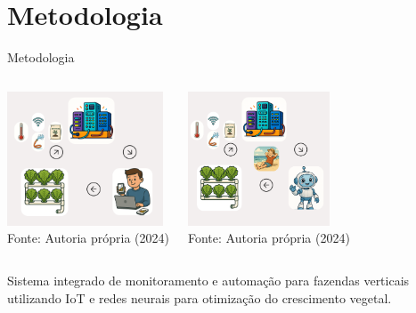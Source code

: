 \documentclass[10pt]{beamer}
\begin{document}
\section{Metodologia}
\begin{frame}{Metodologia}

\centering

\begin{columns}[T,onlytextwidth]
  \centering
  \includegraphics[width=0.9\linewidth,height=4cm,keepaspectratio]{Fazenda vertical 1.png}\\[0.1cm]
  {\footnotesize\textcolor{cpspreto}{Fonte: Autoria própria (2024)}}
  
  \centering
  \includegraphics[width=0.9\linewidth,height=4cm,keepaspectratio]{Fazenda vertical 2.png}\\[0.1cm]
  {\footnotesize\textcolor{cpspreto}{Fonte: Autoria própria (2024)}}
\end{columns}

\vspace{0.5cm}
\begin{center}
{\small\textcolor{cpspreto}{Sistema integrado de monitoramento e automação para fazendas verticais utilizando IoT e redes neurais para otimização do crescimento vegetal.}}
\end{center}

\end{frame}

\end{document}
